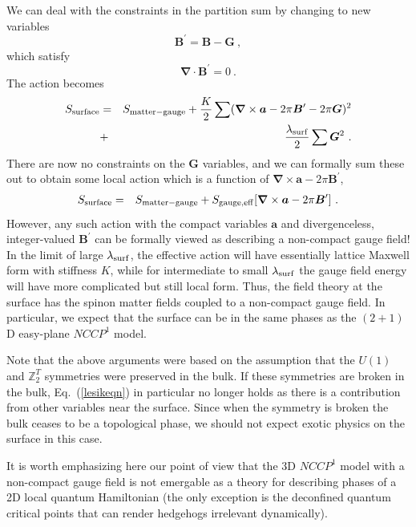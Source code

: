 \documentclass[prb,twocolumn]{revtex4-1}
\def\ztwot{\mathbb{Z}_2^T}
\begin{document}
 We can deal with the constraints in the partition sum by changing to new variables
\begin{equation}
{\bm B}^\prime = {\bm B} - {\bm G} ~,
\end{equation}
which satisfy
\begin{equation}
{\bm \nabla} \cdot {\bm B}^\prime = 0 ~.
\end{equation}
The action becomes 
\begin{eqnarray*}
S_{\rm surface} &=& S_{\rm matter-gauge} + \frac{K}{2}\sum  ({\bm\nabla} \times {\bm a}  - 2\pi {\bm B}^\prime - 2\pi {\bm G})^2 \\
 &+& \frac{\lambda_{\rm surf}}{2}\sum  {\bm G}^2 ~.
\end{eqnarray*}
There are now no constraints on the ${\bm G}$ variables, and we can formally sum these out to obtain some local action which is a function of ${\bm\nabla} \times {\bm a} - 2\pi {\bm B}^\prime$,
\begin{eqnarray*}
S_{\rm surface} &=& S_{\rm matter-gauge} + S_{\rm gauge, eff}[{\bm\nabla} \times {\bm a}  - 2\pi {\bm B}^\prime] ~.
\end{eqnarray*}
However, any such action with the compact variables ${\bm a}$ and divergenceless, integer-valued ${\bm B}^\prime$ can be formally viewed as describing a non-compact gauge field!  In the limit of large $\lambda_{\rm surf}$, the effective action will have essentially lattice Maxwell form with stiffness $K$, while for intermediate to small $\lambda_{\rm surf}$ the gauge field energy will have more complicated but still local form.  Thus, the field theory at the surface has the spinon matter fields coupled to a non-compact gauge field.  In particular, we expect that the surface can be in the same phases as the $(2+1)$D easy-plane $NCCP^1$ model.

Note that the above arguments were based on the assumption that the $U(1)$ and $\ztwot$ symmetries were preserved in the bulk. If these symmetries are broken in the bulk, Eq.~(\ref{lesikeqn}) in particular no longer holds as there is a contribution from other variables near the surface. Since when the symmetry is broken the bulk ceases to be a topological phase, we should not expect exotic physics on the surface in this case.

It is worth emphasizing here our point of view that the 3D $NCCP^1$ model with a non-compact gauge field is not emergable as a theory for describing phases of a 2D local quantum Hamiltonian (the only exception is the deconfined quantum critical points that can render hedgehogs irrelevant dynamically). 
\end{document}
